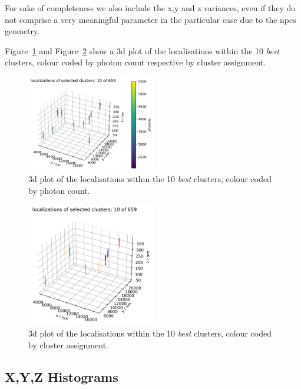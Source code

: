 \documentclass[11pt, a4paper, oneside, twocolumn]{report}
\newcommand{\e}{\emph}
\begin{document}
For sake of completeness we also include the x,y and z variances, even
if they do not comprise a very meaningful parameter in the particular
case due to the \gls{npc}s geometry.

Figure~\ref{f:8_best_filtered_clusters} and
Figure~\ref{f:9_best_filtered_clusters} show a 3d plot of the
localisations within the 10 \e{best} clusters, colour coded by photon
count respective by cluster assignment.

\begin{figure}[h!]
  \centering
  \includegraphics[width=0.5\textwidth]{8_best_filtered_clusters.png}
  \caption{3d plot of the localisations within the 10 \e{best}
    clusters, colour coded by photon count.}
  \label{f:8_best_filtered_clusters}
\end{figure}

\begin{figure}[h!]
  \centering
  \includegraphics[width=0.5\textwidth]{9_best_filtered_clusters.png}
  \caption{3d plot of the localisations within the 10 \e{best}
    clusters, colour coded by cluster assignment.}
  \label{f:9_best_filtered_clusters}
\end{figure}


\subsection{X,Y,Z Histograms}\label{s:r:xyzhist}
\end{document}

